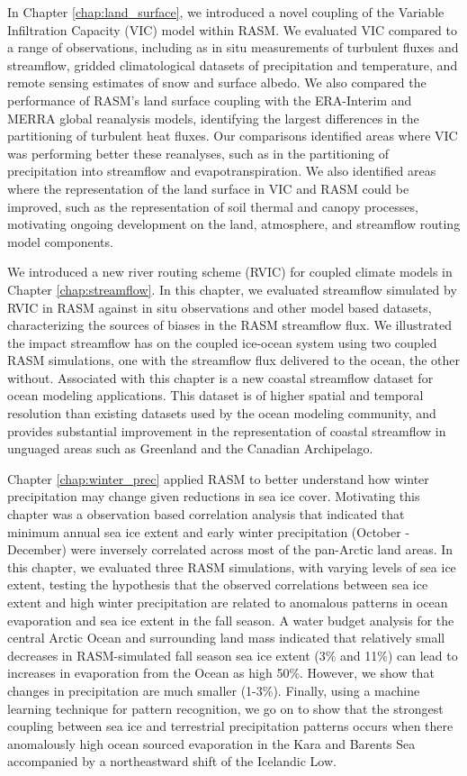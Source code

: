 In Chapter \ref{chap:land_surface}, we introduced a novel coupling of the Variable Infiltration Capacity (VIC) model within RASM.
We evaluated VIC compared to a range of observations, including as in situ measurements of turbulent fluxes and streamflow, gridded climatological datasets of precipitation and temperature, and remote sensing estimates of snow and surface albedo.
We also compared the performance of RASM's land surface coupling with the ERA-Interim and MERRA global reanalysis models, identifying the largest differences in the partitioning of turbulent heat fluxes.
Our comparisons identified areas where VIC was performing better these reanalyses, such as in the partitioning of precipitation into streamflow and evapotranspiration.
We also identified areas where the representation of the land surface in VIC and RASM could be improved, such as the representation of soil thermal and canopy processes, motivating ongoing development on the land, atmosphere, and streamflow routing model components.

We introduced a new river routing scheme (RVIC) for coupled climate models in Chapter \ref{chap:streamflow}.
In this chapter, we evaluated streamflow simulated by RVIC in RASM against in situ observations and other model based datasets, characterizing the sources of biases in the RASM streamflow flux.
We illustrated the impact streamflow has on the coupled ice-ocean system using two coupled RASM simulations, one with the streamflow flux delivered to the ocean, the other without.
Associated with this chapter is a new coastal streamflow dataset for ocean modeling applications.
This dataset is of higher spatial and temporal resolution than existing datasets used by the ocean modeling community, and provides substantial improvement in the representation of coastal streamflow in unguaged areas such as Greenland and the Canadian Archipelago.

Chapter \ref{chap:winter_prec} applied RASM to better understand how winter precipitation may change given reductions in sea ice cover.
Motivating this chapter was a observation based correlation analysis that indicated that minimum annual sea ice extent and early winter precipitation (October - December) were inversely correlated across most of the pan-Arctic land areas.
In this chapter, we evaluated three RASM simulations, with varying levels of sea ice extent, testing the hypothesis that the observed correlations between sea ice extent and high winter precipitation are related to anomalous patterns in ocean evaporation and sea ice extent in the fall season.
A water budget analysis for the central Arctic Ocean and surrounding land mass indicated that relatively small decreases in RASM-simulated fall season sea ice extent (3\% and 11\%) can lead to increases in evaporation from the Ocean as high 50\%.
However, we show that changes in precipitation are much smaller (1-3\%).
Finally, using a machine learning technique for pattern recognition, we go on to show that the strongest coupling between sea ice and terrestrial precipitation patterns occurs when there anomalously high ocean sourced evaporation in the Kara and Barents Sea accompanied by a northeastward shift of the Icelandic Low.

